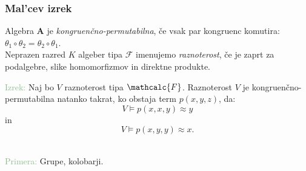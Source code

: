 \documentclass{beamer}
\begin{document}
\begin{frame}
\frametitle{Mal'cev izrek}
Algebra $\mathbf{A}$ je \emph{kongruenčno-permutabilna}, če vsak par kongruenc komutira: \\
$\theta_1 \circ \theta_2 = \theta_2 \circ \theta_1$.\\
Neprazen razred $K$ algeber tipa $\mathcal{F}$ imenujemo \emph{raznoterost}, če je zaprt za podalgebre, 
slike homomorfizmov in direktne produkte.
\pause
\begin{block}{}
\textcolor{darkseagreen}{Izrek:} Naj bo $V$ raznoterost tipa $\mathcalc{F}$. Raznoterost $V$ je kongruenčno-permutabilna
natanko takrat, ko obstaja term $p\left(x, y, z\right)$, da: \\ $$V \models p\left(x,x,y\right)\approx y$$ in $$V \models p\left(x,y,y\right)\approx x.$$
\end{block}\\
\textcolor{darkseagreen}{Primera:} Grupe, kolobarji.


\end{frame}
\end{document}
